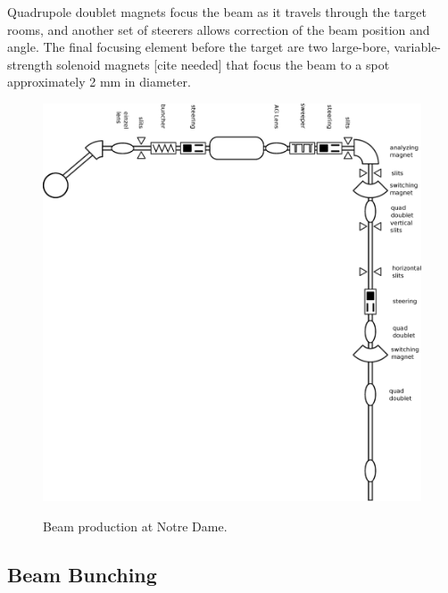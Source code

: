 Quadrupole doublet magnets focus the beam as it travels through the target rooms, and another set of steerers allows correction of the beam position and angle.  The final focusing element before the target are two large-bore, variable-strength solenoid magnets [cite needed] that focus the beam to a spot approximately 2 mm in diameter.

\begin{figure}[htp]
\centering
\includegraphics[width=1.0\textwidth]{figures/NSL_beamline.eps}
\label{fig:beamline}
\caption{Beam production at Notre Dame.}
\end{figure}

\subsection{Beam Bunching}

